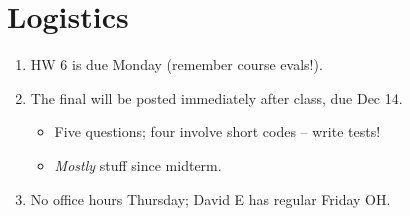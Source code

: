 \section{Logistics}

\begin{enumerate}
\item HW 6 is due Monday (remember course evals!).
\item The final will be posted immediately after class, due Dec 14.
  \begin{itemize}
  \item Five questions; four involve short codes -- write tests!
  \item {\em Mostly} stuff since midterm.
  \end{itemize}
\item No office hours Thursday; David E has regular Friday OH.
\end{enumerate}

